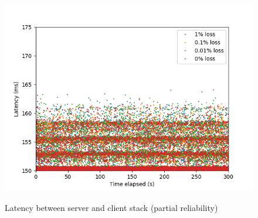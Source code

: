 \documentclass{mpaper}
\begin{document}
\begin{figure}
{   \includegraphics[scale=0.5]{images/graphics-partial/150ms-stack-latencies-combined-PARTIAL.png}
   \label{stack-par-150}
 }
 \caption{Latency between server and client stack (partial reliability)}
 \label{stack-par}
\end{figure}
\end{document}
